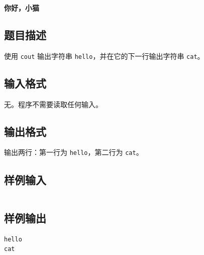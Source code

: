 \documentclass{article}
\newcommand{\problemname}[1]{\begin{center}\Large\bfseries #1\end{center}}
\begin{document}
\problemname{你好，小猫}

\subsection*{题目描述}
使用 \texttt{cout} 输出字符串 \texttt{hello}，并在它的下一行输出字符串 \texttt{cat}。

\subsection*{输入格式}
无。程序不需要读取任何输入。

\subsection*{输出格式}
输出两行：第一行为 \texttt{hello}，第二行为 \texttt{cat}。

\subsection*{样例输入}
\begin{verbatim}

\end{verbatim}

\subsection*{样例输出}
\begin{verbatim}
hello
cat
\end{verbatim}
\end{document}
